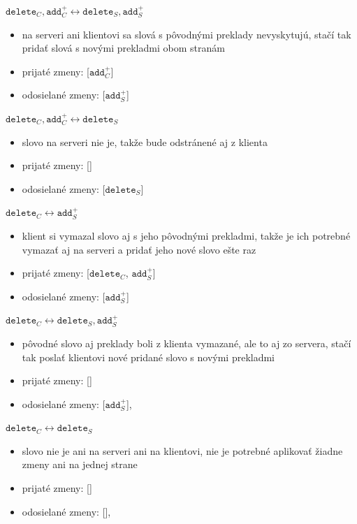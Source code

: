 \documentclass[
  digital, %
  table,   %
  lof,     %
  lot,     %
]{fithesis3}
\begin{document}
\noindent
$\texttt{delete}_{C}, \texttt{add}_{C}^+ \longleftrightarrow \texttt{delete}_{S}, \texttt{add}_{S}^+$
\begin{itemize}
\item na serveri ani klientovi sa slová s pôvodnými preklady nevyskytujú, stačí tak pridať slová s novými prekladmi obom stranám
\item prijaté zmeny: [$\texttt{add}_{C}^+$]
\item odosielané zmeny: [$\texttt{add}_{S}^+$]
\end{itemize}

\noindent
$\texttt{delete}_{C}, \texttt{add}_{C}^+ \longleftrightarrow \texttt{delete}_{S}$
\begin{itemize}
\item slovo na serveri nie je, takže bude odstránené aj z klienta
\item prijaté zmeny: []
\item odosielané zmeny: [$\texttt{delete}_{S}$]
\end{itemize}
\noindent
$\texttt{delete}_{C} \longleftrightarrow \texttt{add}_{S}^+$
\begin{itemize}
\item klient si vymazal slovo aj s jeho pôvodnými prekladmi, takže je ich potrebné vymazať aj na serveri a pridať jeho nové slovo ešte raz
\item prijaté zmeny: [$\texttt{delete}_{C}$, $\texttt{add}_{S}^+$]
\item odosielané zmeny: [$\texttt{add}_{S}^+$]
\end{itemize}

\noindent
$\texttt{delete}_{C} \longleftrightarrow \texttt{delete}_{S}, \texttt{add}_{S}^+$
\begin{itemize}
\item pôvodné slovo aj preklady boli z klienta vymazané, ale to aj zo servera, stačí tak poslať klientovi nové pridané slovo s novými prekladmi
\item prijaté zmeny: []
\item odosielané zmeny: [$\texttt{add}_{S}^+$],
\end{itemize}

\noindent
$\texttt{delete}_{C} \longleftrightarrow \texttt{delete}_{S}$
\begin{itemize}
\item slovo nie je ani na serveri ani na klientovi, nie je potrebné aplikovať žiadne zmeny ani na jednej strane
\item prijaté zmeny: []
\item odosielané zmeny: [],
\end{itemize}
\end{document}
